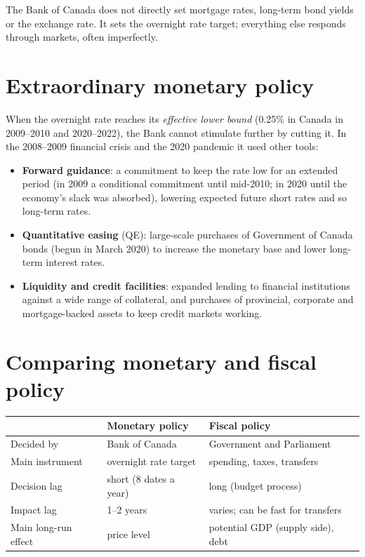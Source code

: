 \begin{important}[Pitfall]
The Bank of Canada does not directly set mortgage rates, long-term bond yields or the
exchange rate. It sets the overnight rate target; everything else responds through
markets, often imperfectly.
\end{important}

\section{Extraordinary monetary policy}

When the overnight rate reaches its \emph{effective lower bound} (0.25\% in Canada in
2009--2010 and 2020--2022), the Bank cannot stimulate further by cutting it. In the
2008--2009 financial crisis and the 2020 pandemic it used other tools:
\begin{itemize}
  \item \textbf{Forward guidance}: a commitment to keep the rate low for an extended
        period (in 2009 a conditional commitment until mid-2010; in 2020 until the
        economy's slack was absorbed), lowering expected future short rates and so
        long-term rates.
  \item \textbf{Quantitative easing} (QE): large-scale purchases of Government of Canada
        bonds (begun in March 2020) to increase the monetary base and lower long-term
        interest rates.
  \item \textbf{Liquidity and credit facilities}: expanded lending to financial
        institutions against a wide range of collateral, and purchases of provincial,
        corporate and mortgage-backed assets to keep credit markets working.
\end{itemize}

\section{Comparing monetary and fiscal policy}

\begin{center}
\begin{tabular}{lll}
\toprule
 & Monetary policy & Fiscal policy \\
\midrule
Decided by & Bank of Canada & Government and Parliament \\
Main instrument & overnight rate target & spending, taxes, transfers \\
Decision lag & short (8 dates a year) & long (budget process) \\
Impact lag & 1--2 years & varies; can be fast for transfers \\
Main long-run effect & price level & potential GDP (supply side), debt \\
\bottomrule
\end{tabular}
\end{center}

